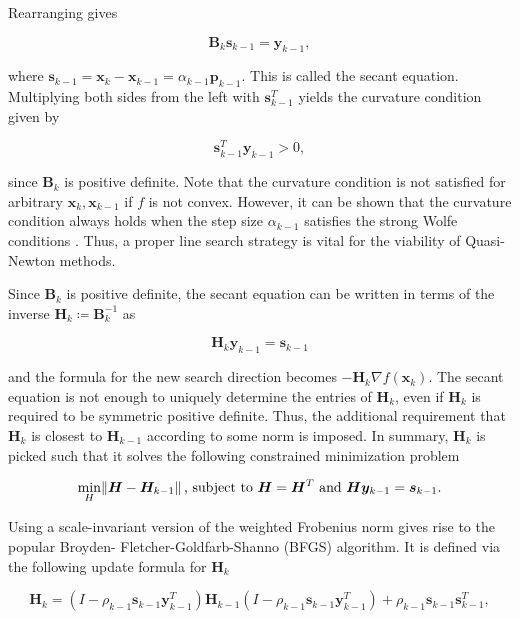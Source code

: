 \noindent Rearranging gives

\begin{equation}\label{eq:secant-equation}
    \bm{B}_k \bm{s}_{k-1} = \bm{y}_{k-1},
\end{equation}

\noindent where $\bm{s}_{k-1} = \bm{x}_k - \bm{x}_{k-1} = \alpha_{k-1}\bm{p}_{k-1}$. This is called the secant equation. 
Multiplying both sides from the left with $\bm{s}_{k-1}^T$ yields the curvature condition given by

\begin{equation}\label{eq:curvature-condition}
    \bm{s}_{k-1}^T \bm{y}_{k-1} > 0,
\end{equation}

\noindent since $\bm{B}_k$ is positive definite. Note that the curvature condition is not satisfied for arbitrary $\bm{x}_k, \bm{x}_{k-1}$ 
if $f$ is 
not convex. However, it can be shown that the curvature condition always holds when the step size $\alpha_{k-1}$ satisfies the strong Wolfe 
conditions \cite{nocedal2006}. Thus, a proper line search strategy is vital for the viability of Quasi-Newton methods.

Since $\bm{B}_k$ is positive definite, the secant equation can be written in terms of the inverse $\bm{H}_k \coloneqq \bm{B}^{-1}_k$ as

\[
    \bm{H}_k \bm{y}_{k-1} = \bm{s}_{k-1}
\]

\noindent and the formula for the new search direction becomes $-\bm{H}_k \nabla f(\bm{x}_k)$. The secant equation is not enough to uniquely determine
the entries of $\bm{H}_k$, even if $\bm{H}_k$ is required to be symmetric positive definite. Thus, the additional requirement that $\bm{H}_k$
is closest to $\bm{H}_{k-1}$ according to some norm is imposed. In summary, $\bm{H}_k$ is picked such that it solves the following constrained
minimization problem

\begin{align*}
    \min_{H} \norm{\bm{H} - \bm{H}_{k-1}} \text{, subject to } \bm{H} = \bm{H}^T \text{ and } \bm{H}\bm{y}_{k-1} = \bm{s}_{k-1}.
\end{align*}

Using a scale-invariant version of the weighted Frobenius norm gives rise to the popular Broyden- Fletcher-Goldfarb-Shanno (BFGS) algorithm.
It is defined via the following update formula for $\bm{H}_k$

\begin{equation}\label{eq:bfgs-update}
    \bm{H}_k = (I - \rho_{k-1}\bm{s}_{k-1}\bm{y}^T_{k-1})\bm{H}_{k-1}(I - \rho_{k-1}\bm{s}_{k-1}\bm{y}^T_{k-1}) + \rho_{k-1}\bm{s}_{k-1}\bm{s}^T_{k-1},
\end{equation}

